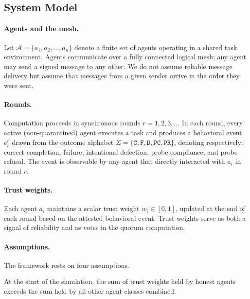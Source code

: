 \subsection{System Model}
\label{sec:model}

\paragraph{Agents and the mesh.}
Let $\mathcal{A} = \{a_1, a_2, \ldots, a_n\}$ denote a finite set of agents operating in
a shared task environment.  Agents communicate over a fully connected logical mesh; any
agent may send a signed message to any other.  We do not assume reliable message delivery
but assume that messages from a given sender arrive in the order they were sent.

\paragraph{Rounds.}
Computation proceeds in synchronous rounds $r = 1, 2, 3, \ldots$  In each round, every
active (non-quarantined) agent executes a task and produces a behavioral event $e_i^r$
drawn from the outcome alphabet $\Sigma = \{\mathtt{C}, \mathtt{F}, \mathtt{D},
\mathtt{PC}, \mathtt{PR}\}$, denoting respectively: correct completion, failure,
intentional defection, probe compliance, and probe refusal.  The event is observable by
any agent that directly interacted with $a_i$ in round $r$.

\paragraph{Trust weights.}
Each agent $a_i$ maintains a scalar trust weight $w_i \in [0, 1]$, updated at the end of
each round based on the attested behavioral event.  Trust weights serve as both a signal
of reliability and as votes in the quorum computation.

\paragraph{Assumptions.}
The framework rests on four assumptions.

\begin{assumption}\label{asm:majority}
At the start of the simulation, the sum of trust weights held by honest agents exceeds
the sum held by all other agent classes combined.
\end{assumption}

